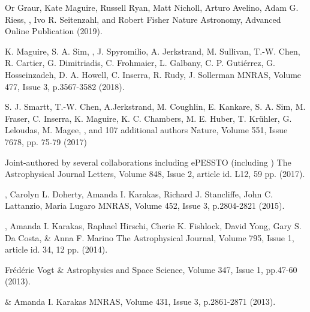 {Or Graur, Kate Maguire, Russell Ryan, Matt Nicholl, Arturo Avelino, Adam G. Riess, , Ivo R. Seitenzahl, and Robert Fisher}
{Nature Astronomy, Advanced Online Publication (2019).}

{K. Maguire, S. A. Sim, , J. Spyromilio, A. Jerkstrand, M. Sullivan, T.-W. Chen, R. Cartier, G. Dimitriadis, C. Frohmaier, L. Galbany, C. P. Gutiérrez, G. Hosseinzadeh, D. A. Howell, C. Inserra, R. Rudy, J. Sollerman}
{MNRAS, Volume 477, Issue 3, p.3567-3582 (2018).}

{S. J. Smartt, T.-W. Chen, A.Jerkstrand, M. Coughlin, E. Kankare, S. A. Sim, M. Fraser, C. Inserra, K. Maguire, K. C. Chambers,
M. E. Huber, T. Kr\"uhler, G. Leloudas, M. Magee, , and 107 additional authors}
{Nature, Volume 551, Issue 7678, pp. 75-79 (2017)}

{Joint-authored by several collaborations including ePESSTO (including )}
{The Astrophysical Journal Letters, Volume 848, Issue 2, article id. L12, 59 pp. (2017).}

{, Carolyn L. Doherty, Amanda I. Karakas, Richard J. Stancliffe, John C. Lattanzio, Maria Lugaro}
{MNRAS, Volume 452, Issue 3, p.2804-2821 (2015).}

{, Amanda I. Karakas, Raphael Hirschi, Cherie K. Fishlock, David Yong, Gary S. Da Costa, \& Anna F. Marino}
{The Astrophysical Journal, Volume 795, Issue 1, article id. 34, 12 pp. (2014).}

{Fr\'{e}d\'{e}ric Vogt \& }
{Astrophysics and Space Science, Volume 347, Issue 1, pp.47-60 (2013).}

{ \& Amanda I. Karakas}
{MNRAS, Volume 431, Issue 3, p.2861-2871 (2013).}

